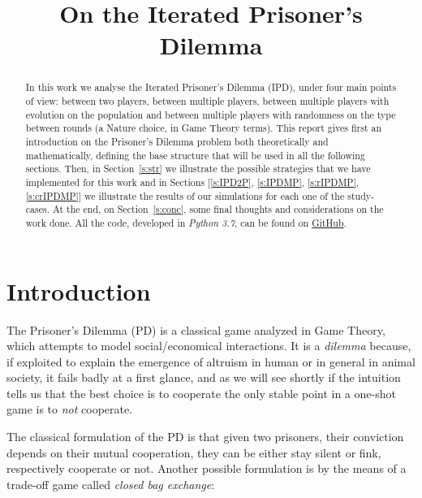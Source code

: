\documentclass[journal,a4paper,10pt,twoside]{IEEEtran}
\begin{document}
\title{On the Iterated Prisoner's Dilemma}

\author{%

}

\maketitle

\begin{abstract}
In this work we analyse the Iterated Prisoner's Dilemma (IPD), under four main points of view: between two players, between multiple players, between multiple players with evolution on the population and between multiple players with randomness on the type between rounds (a Nature choice, in Game Theory terms).
This report gives first an introduction on the Prisoner's Dilemma problem both theoretically and mathematically, defining the base structure that will be used in all the following sections.
Then, in Section~\ref{s:str} we illustrate the possible strategies that we have implemented for this work and in Sections [\ref{s:IPD2P}, \ref{s:IPDMP}, \ref{s:rIPDMP}, \ref{s:crIPDMP}] we illustrate the results of our simulations for each one of the study-cases.
At the end, on Section~\ref{s:conc}, some final thoughts and considerations on the work done.
All the code, developed in \textit{Python 3.7}, can be found on \href{https://github.com/eliabntt/LaboratoryOfComputationalPhysics/tree/Group9}{GitHub}.
\end{abstract}

\section{Introduction} 
The Prisoner's Dilemma (PD) is a classical game analyzed in Game Theory, which attempts to model social/economical interactions. It is a \textit{dilemma} because, if exploited to explain the emergence of altruism in human or in general in animal society, it fails badly at a first glance, and as we will see shortly if the intuition tells us that the best choice is to cooperate the only stable point in a one-shot game is to \textit{not} cooperate.

The classical formulation of the PD is that given two prisoners, their conviction depends on their mutual cooperation, they can be either stay silent or fink, respectively cooperate or not. 
Another possible formulation is by the means of a trade-off game called \textit{closed bag exchange}:
\end{document}
